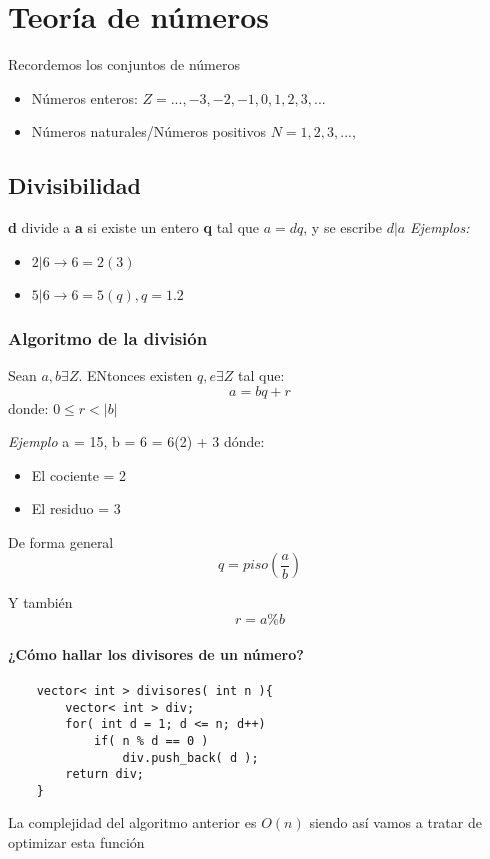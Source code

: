 \chapter{Teoría de números}
Recordemos los conjuntos de números 
\begin{itemize}
    \item Números enteros: $Z = {..., -3, -2, -1, 0, 1, 2, 3, ... }$
    \item Números naturales/Números positivos $N = {1, 2, 3, ..., }$
\end{itemize}

\section{Divisibilidad}
\textbf{d} divide a \textbf{a} si existe un entero \textbf{q} tal que $a = dq$, y se escribe $d|a$\break
\textit{Ejemplos:}\break 
\begin{itemize}
    \item {$2|6 \rightarrow 6 = 2(3)$}
    \item {$5|6 \rightarrow 6 = 5(q), q = 1.2$}
\end{itemize}

\subsection{Algoritmo de la división}
Sean \textbf{$a,b \exists Z$}. ENtonces existen \textbf{$q, e \exists Z$} tal que:\break
\[ a = bq + r \]
donde: $0 \leq r < |b|$ \newline

\textit{Ejemplo} \newline
a = 15, b = 6  = 6(2) + 3 \newline 
dónde: 
\begin{itemize}
    \item {El cociente = 2}
    \item {El residuo = 3}
\end{itemize}

De forma general 
\[
    q = piso \left ( \frac{a}{b} \right )
\]

Y también 
\[
    r = a \% b    
\]

\subsubsection{¿Cómo hallar los divisores de un número?}
\begin{lstlisting}
    vector< int > divisores( int n ){
        vector< int > div;
        for( int d = 1; d <= n; d++)
            if( n % d == 0 )
                div.push_back( d );
        return div;
    }
\end{lstlisting}
La complejidad del algoritmo anterior es $O(n)$ siendo así vamos a tratar de optimizar esta función\newline

